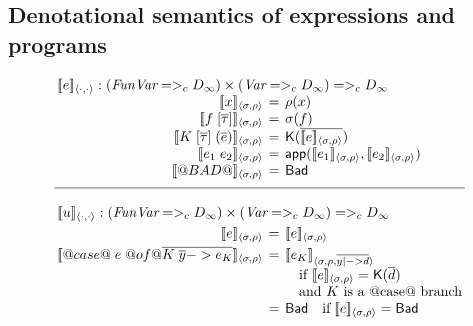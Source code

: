 

\subsection{Denotational semantics of expressions and programs}

\begin{figure}
$$
\setlength{\arraycolsep}{2pt}
\begin{array}{c}
\begin{array}{rcl}
\multicolumn{3}{l}{\interp{e}{\cdot}{\cdot} : (\FVarCpo =>_c D_{\infty}) \times (\VarCpo =>_c D_{\infty}) =>_c D_{\infty}} \\
  \interp{x}{\sigma}{\rho} & = & \rho(x) \\ 
  \interp{f\;[\taus]}{\sigma}{\rho} & = & \sigma(f) \\
  \interp{K\;[\taus]\;(\ol{e})}{\sigma}{\rho} & = & \roll{\ret{\injK{K}{\ol{\interp{e}{\sigma}{\rho}}}}} \\ 
  \interp{e_1\;e_2}{\sigma}{\rho} & = & \dapp(\interp{e_1}{\sigma}{\rho}, \interp{e_2}{\sigma}{\rho}) \\ 
  \interp{@BAD@}{\sigma}{\rho} & = & \roll{\ret{\injBad}} \\[2mm] 
\hline \\
\multicolumn{3}{l}{\interp{u}{\cdot}{\cdot} : (\FVarCpo =>_c D_{\infty}) \times (\VarCpo =>_c D_{\infty}) =>_c D_{\infty}} \\[1mm]
  \interp{e}{\sigma}{\rho} & = & \interp{e}{\sigma}{\rho} \\[1mm]
  \interp{@case@\;e\;@of@ \ol{ K\;\ys -> e_K}}{\sigma}{\rho} 
          & = & \unroll{\interp{e_K}{\sigma}{\rho, \ol{y |-> d}}} \\ 
          & & \quad \text{if $\unroll{\interp{e}{\sigma}{\rho}} = \injK{K}{\ol{d}}$} \\
          & & \quad \text{and $K$ is a @case@ branch} \\
          & = & \injBad \quad \text{if}\; \unroll{\interp{e}{\sigma}{\rho}} = \injBad \\

\end{array}
\end{array}$$
\end{figure}
